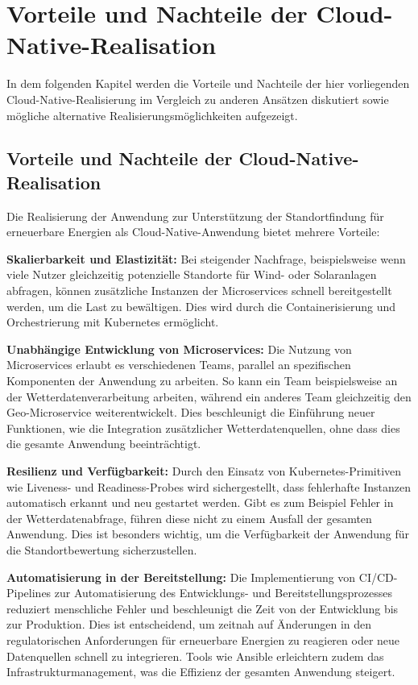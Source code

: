 \chapter{Vorteile und Nachteile der Cloud-Native-Realisation}
In dem folgenden Kapitel werden die Vorteile und Nachteile der hier vorliegenden Cloud-Native-Realisierung im Vergleich zu anderen Ansätzen diskutiert sowie mögliche alternative Realisierungsmöglichkeiten aufgezeigt.

\section{Vorteile und Nachteile der Cloud-Native-Realisation}

Die Realisierung der Anwendung zur Unterstützung der Standortfindung für erneuerbare Energien als Cloud-Native-Anwendung bietet mehrere Vorteile:

\textbf{Skalierbarkeit und Elastizität:} Bei steigender Nachfrage, beispielsweise wenn viele Nutzer gleichzeitig potenzielle Standorte für Wind- oder Solaranlagen abfragen, können zusätzliche Instanzen der Microservices schnell bereitgestellt werden, um die Last zu bewältigen. Dies wird durch die Containerisierung und Orchestrierung mit Kubernetes ermöglicht.

\textbf{Unabhängige Entwicklung von Microservices:} Die Nutzung von Microservices erlaubt es verschiedenen Teams, parallel an spezifischen Komponenten der Anwendung zu arbeiten. So kann ein Team beispielsweise an der Wetterdatenverarbeitung arbeiten, während ein anderes Team gleichzeitig den Geo-Microservice weiterentwickelt. Dies beschleunigt die Einführung neuer Funktionen, wie die Integration zusätzlicher Wetterdatenquellen, ohne dass dies die gesamte Anwendung beeinträchtigt.

\textbf{Resilienz und Verfügbarkeit:} Durch den Einsatz von Kubernetes-Primitiven wie Liveness- und Readiness-Probes wird sichergestellt, dass fehlerhafte Instanzen automatisch erkannt und neu gestartet werden. Gibt es zum Beispiel Fehler in der Wetterdatenabfrage, führen diese nicht zu einem Ausfall der gesamten Anwendung. Dies ist besonders wichtig, um die Verfügbarkeit der Anwendung für die Standortbewertung sicherzustellen.

\textbf{Automatisierung in der Bereitstellung:} Die Implementierung von CI/CD-Pipelines zur Automatisierung des Entwicklungs- und Bereitstellungsprozesses reduziert menschliche Fehler und beschleunigt die Zeit von der Entwicklung bis zur Produktion. Dies ist entscheidend, um zeitnah auf Änderungen in den regulatorischen Anforderungen für erneuerbare Energien zu reagieren oder neue Datenquellen schnell zu integrieren. Tools wie Ansible erleichtern zudem das Infrastrukturmanagement, was die Effizienz der gesamten Anwendung steigert.


